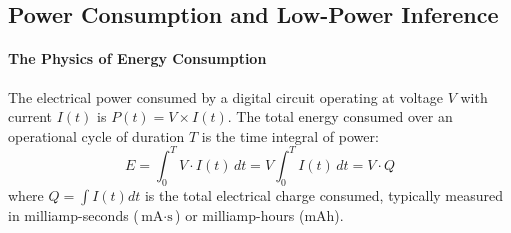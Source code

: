 \subsection{Power Consumption and Low-Power Inference}\label{subsec:power_consumption}

\paragraph{The Physics of Energy Consumption}
The electrical power consumed by a digital circuit operating at voltage $V$ with current $I(t)$ is $P(t) = V \times I(t)$. The total energy consumed over an operational cycle of duration $T$ is the time integral of power:
\begin{equation}
E = \int_0^T V \cdot I(t) \, dt = V \int_0^T I(t) \, dt = V \cdot Q\label{eq:energy_integral}
\end{equation}
where $Q = \int I(t) dt$ is the total electrical charge consumed, typically measured in milliamp-seconds ($\text{mA}\cdot\text{s}$) or milliamp-hours ($\text{mAh}$).

